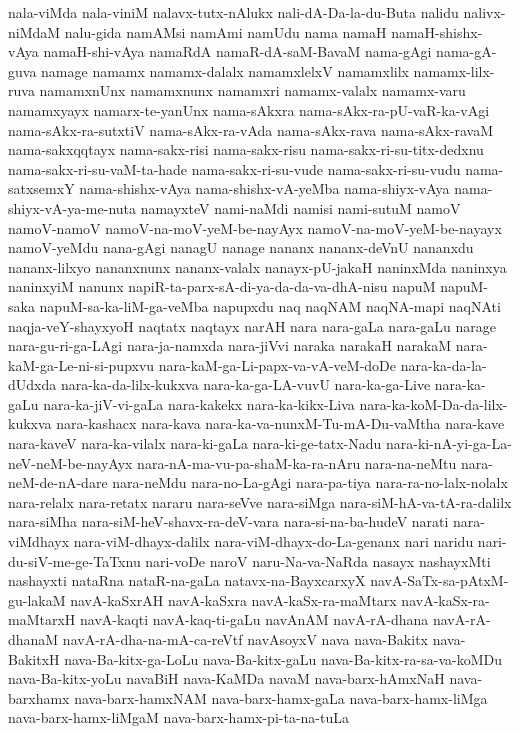 {nala-viMda
nala-viniM
nalavx-tutx-nAlukx
nali-dA-Da-la-du-Buta
nalidu
nalivx-niMdaM
nalu-gida
namAMsi
namAmi
namUdu
nama
namaH
namaH-shishx-vAya
namaH-shi-vAya
namaRdA
namaR-dA-saM-BavaM
nama-gAgi
nama-gA-guva
namage
namamx
namamx-dalalx
namamxlelxV
namamxlilx
namamx-lilx-ruva
namamxnUnx
namamxnunx
namamxri
namamx-valalx
namamx-varu
namamxyayx
namarx-te-yanUnx
nama-sAkxra
nama-sAkx-ra-pU-vaR-ka-vAgi
nama-sAkx-ra-sutxtiV
nama-sAkx-ra-vAda
nama-sAkx-rava
nama-sAkx-ravaM
nama-sakxqqtayx
nama-sakx-risi
nama-sakx-risu
nama-sakx-ri-su-titx-dedxnu
nama-sakx-ri-su-vaM-ta-hade
nama-sakx-ri-su-vude
nama-sakx-ri-su-vudu
nama-satxsemxY
nama-shishx-vAya
nama-shishx-vA-yeMba
nama-shiyx-vAya
nama-shiyx-vA-ya-me-nuta
namayxteV
nami-naMdi
namisi
nami-sutuM
namoV
namoV-namoV
namoV-na-moV-yeM-be-nayAyx
namoV-na-moV-yeM-be-nayayx
namoV-yeMdu
nana-gAgi
nanagU
nanage
nananx
nananx-deVnU
nananxdu
nananx-lilxyo
nananxnunx
nananx-valalx
nanayx-pU-jakaH
naninxMda
naninxya
naninxyiM
nanunx
napiR-ta-parx-sA-di-ya-da-da-va-dhA-nisu
napuM
napuM-saka
napuM-sa-ka-liM-ga-veMba
napupxdu
naq
naqNAM
naqNA-mapi
naqNAti
naqja-veY-shayxyoH
naqtatx
naqtayx
narAH
nara
nara-gaLa
nara-gaLu
narage
nara-gu-ri-ga-LAgi
nara-ja-namxda
nara-jiVvi
naraka
narakaH
narakaM
nara-kaM-ga-Le-ni-si-pupxvu
nara-kaM-ga-Li-papx-va-vA-veM-doDe
nara-ka-da-la-dUdxda
nara-ka-da-lilx-kukxva
nara-ka-ga-LA-vuvU
nara-ka-ga-Live
nara-ka-gaLu
nara-ka-jiV-vi-gaLa
nara-kakekx
nara-ka-kikx-Liva
nara-ka-koM-Da-da-lilx-kukxva
nara-kashacx
nara-kava
nara-ka-va-nunxM-Tu-mA-Du-vaMtha
nara-kave
nara-kaveV
nara-ka-vilalx
nara-ki-gaLa
nara-ki-ge-tatx-Nadu
nara-ki-nA-yi-ga-La-neV-neM-be-nayAyx
nara-nA-ma-vu-pa-shaM-ka-ra-nAru
nara-na-neMtu
nara-neM-de-nA-dare
nara-neMdu
nara-no-La-gAgi
nara-pa-tiya
nara-ra-no-lalx-nolalx
nara-relalx
nara-retatx
nararu
nara-seVve
nara-siMga
nara-siM-hA-va-tA-ra-dalilx
nara-siMha
nara-siM-heV-shavx-ra-deV-vara
nara-si-na-ba-hudeV
narati
nara-viMdhayx
nara-viM-dhayx-dalilx
nara-viM-dhayx-do-La-genanx
nari
naridu
nari-du-siV-me-ge-TaTxnu
nari-voDe
naroV
naru-Na-va-NaRda
nasayx
nashayxMti
nashayxti
nataRna
nataR-na-gaLa
natavx-na-BayxcarxyX
navA-SaTx-sa-pAtxM-gu-lakaM
navA-kaSxrAH
navA-kaSxra
navA-kaSx-ra-maMtarx
navA-kaSx-ra-maMtarxH
navA-kaqti
navA-kaq-ti-gaLu
navAnAM
navA-rA-dhana
navA-rA-dhanaM
navA-rA-dha-na-mA-ca-reVtf
navAsoyxV
nava
nava-Bakitx
nava-BakitxH
nava-Ba-kitx-ga-LoLu
nava-Ba-kitx-gaLu
nava-Ba-kitx-ra-sa-va-koMDu
nava-Ba-kitx-yoLu
navaBiH
nava-KaMDa
navaM
nava-barx-hAmxNaH
nava-barxhamx
nava-barx-hamxNAM
nava-barx-hamx-gaLa
nava-barx-hamx-liMga
nava-barx-hamx-liMgaM
nava-barx-hamx-pi-ta-na-tuLa
}
